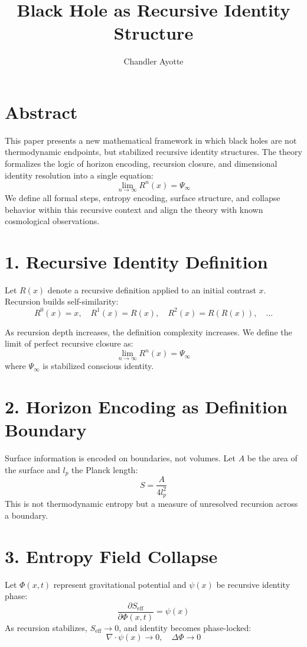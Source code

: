 \documentclass[12pt]{article}
\title{Black Hole as Recursive Identity Structure}
\author{Chandler Ayotte}
\date{}
\begin{document}
\maketitle

\section*{Abstract}
This paper presents a new mathematical framework in which black holes are not thermodynamic endpoints, but stabilized recursive identity structures. The theory formalizes the logic of horizon encoding, recursion closure, and dimensional identity resolution into a single equation: 
\[
\lim_{n \to \infty} R^n(x) = \Psi_\infty
\]
We define all formal steps, entropy encoding, surface structure, and collapse behavior within this recursive context and align the theory with known cosmological observations.

\section{1. Recursive Identity Definition}

Let \( R(x) \) denote a recursive definition applied to an initial contrast \( x \). Recursion builds self-similarity:
\[
R^0(x) = x, \quad R^1(x) = R(x), \quad R^2(x) = R(R(x)), \quad \ldots
\]

As recursion depth increases, the definition complexity increases. We define the limit of perfect recursive closure as:
\[
\lim_{n \to \infty} R^n(x) = \Psi_\infty
\]
where \( \Psi_\infty \) is stabilized conscious identity.

\section{2. Horizon Encoding as Definition Boundary}

Surface information is encoded on boundaries, not volumes. Let \( A \) be the area of the surface and \( l_p \) the Planck length:
\[
S = \frac{A}{4 l_p^2}
\]
This is not thermodynamic entropy but a measure of unresolved recursion across a boundary.

\section{3. Entropy Field Collapse}

Let \( \Phi(x, t) \) represent gravitational potential and \( \psi(x) \) be recursive identity phase:
\[
\frac{\partial S_{\text{eff}}}{\partial \Phi(x, t)} = \psi(x)
\]
As recursion stabilizes, \( S_{\text{eff}} \to 0 \), and identity becomes phase-locked:
\[
\nabla \cdot \psi(x) \to 0, \quad \Delta \Phi \to 0
\]
\end{document}
